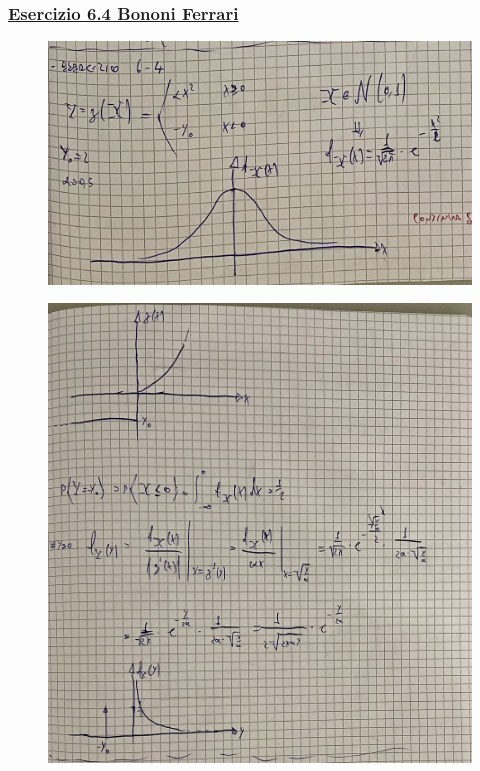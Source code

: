 \documentclass{article}
\begin{document}
\subsubsection{\underline{Esercizio 6.4 Bononi Ferrari}}
\begin{figure}[H]
\centering
\includegraphics[scale=0.10]{ese/31.jpeg}
\end{figure}
\begin{figure}[H]
\centering
\includegraphics[scale=0.10]{ese/31a.jpeg}
\end{figure}
\end{document}
